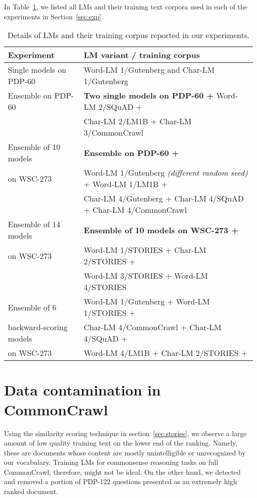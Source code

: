 \documentclass{article}
\begin{document}
In Table~\ref{tab:usage}, we listed all LMs and their training text corpora used in each of the experiments in Section~\ref{sec:exp}.

\begin{table}[h!]
  \caption{Details of LMs and their training corpus reported in our experiments.}
  \label{tab:usage}
  \centering
  \small
  \begin{tabular}{l|l}
    \toprule
    \textbf{Experiment}  & \textbf{LM variant / training corpus} \\
    \midrule
    Single models on PDP-60 & Word-LM 1/Gutenberg and Char-LM 1/Gutenberg \\
    \midrule
    Ensemble on PDP-60 & \textbf{Two single models on PDP-60 +}  Word-LM 2/SQuAD + \\
     & Char-LM 2/LM1B + Char-LM 3/CommonCrawl  \\
    \midrule
    Ensemble of 10 models & \textbf{Ensemble on PDP-60 +} \\ 
    on WSC-273    & Word-LM 1/Gutenberg {\it (different random seed)} + Word-LM 1/LM1B + \\
                  & Char-LM 4/Gutenberg + Char-LM 4/SQuAD + Char-LM 4/CommonCrawl \\
    \midrule
    Ensemble of 14 models & \textbf{Ensemble of 10 models on WSC-273 +}  \\
    on WSC-273 & Word-LM 1/STORIES + Char-LM 2/STORIES + \\
     & Word-LM 3/STORIES + Word-LM 4/STORIES \\
    \midrule
    Ensemble of 6 & Word-LM 1/Gutenberg + Word-LM 1/STORIES + \\
    backward-scoring models & Char-LM 4/CommonCrawl + Char-LM 4/SQuAD +\\
    on WSC-273 & Word-LM 4/LM1B + Char-LM 2/STORIES + \\
    \bottomrule
  \end{tabular}
\end{table}

\section{Data contamination in CommonCrawl}

Using the similarity scoring technique in section~\ref{sec:stories}, we observe a large amount of low quality training text on the lower end of the ranking. Namely, these are documents whose content are mostly unintelligible or unrecognized by our vocabulary. Training LMs for commonsense reasoning tasks on full CommonCrawl, therefore, might not be ideal. On the other hand, we detected and removed a portion of PDP-122 questions presented as an extremely high ranked document.
\end{document}
